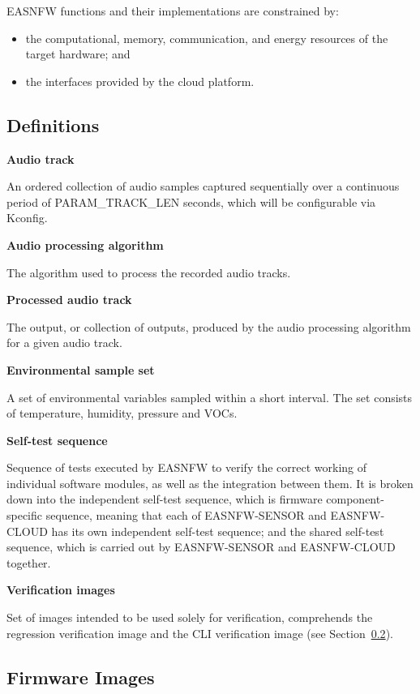 \documentclass[11pt,a4paper]{article}
\begin{document}
EASNFW functions and their implementations are constrained by:

\begin{itemize}
    \item the computational, memory, communication, and energy resources of the
          target hardware; and
    \item the interfaces provided by the cloud platform.
\end{itemize}

\subsection{Definitions}

\textbf{Audio track}

An ordered collection of audio samples captured sequentially over a continuous
period of PARAM\_TRACK\_LEN seconds, which will be configurable via Kconfig.

\textbf{Audio processing algorithm}

The algorithm used to process the recorded audio tracks.

\textbf{Processed audio track}

The output, or collection of outputs, produced by the audio processing
algorithm for a given audio track.

\textbf{Environmental sample set}

A set of environmental variables sampled within a short interval. The set
consists of temperature, humidity, pressure and VOCs.

\textbf{Self-test sequence}

Sequence of tests executed by EASNFW to verify the correct working of
individual software modules, as well as the integration between them. It is
broken down into the independent self-test sequence, which is firmware
component-specific sequence, meaning that each of EASNFW-SENSOR and
EASNFW-CLOUD has its own independent self-test sequence; and the shared
self-test sequence, which is carried out by EASNFW-SENSOR and EASNFW-CLOUD
together.

\textbf{Verification images}

Set of images intended to be used solely for verification, comprehends the
regression verification image and the CLI verification image (see
Section~\ref{sec:firmware-images}).

\subsection{Firmware Images}
\label{sec:firmware-images}
\end{document}
